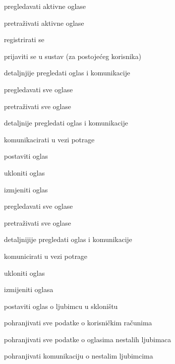 			
			\begin{packed_enum}
				\item  {}
				\begin{packed_enum}
					\item pregledavati aktivne oglase
					\item pretraživati aktivne oglase
					\item registrirati se
					\item prijaviti se u sustav (za postojećeg korisnika)
					\item detaljnjije pregledati oglas i komunikacije
				\end{packed_enum}
			
				\item  {}
				\begin{packed_enum}
					\item pregledavati sve oglase
					\item pretraživati sve oglase
					\item detaljnije pregledati oglas i komunikacije
					\item komunikacirati u vezi potrage
					\item postaviti oglas
					\item ukloniti oglas
					\item izmjeniti oglas
				\end{packed_enum}
				
				\item  {}
				\begin{packed_enum}
					\item pregledavati sve oglase
					\item pretraživati sve oglase
					\item detaljnijije pregledati oglas i komunikacije
					\item komunicirati u vezi potrage
					\item ukloniti oglas
					\item izmijeniti oglasa
					\item postaviti oglas o ljubimcu u skloništu
				\end{packed_enum}
				
				\item  {}
				\begin{packed_enum}
					\item pohranjivati sve podatke o korisničkim računima
					\item pohranjivati sve podatke o oglasima nestalih ljubimaca
					\item pohranjivati komunikaciju o nestalim ljubimcima
				\end{packed_enum}
				
			\end{packed_enum}
			
